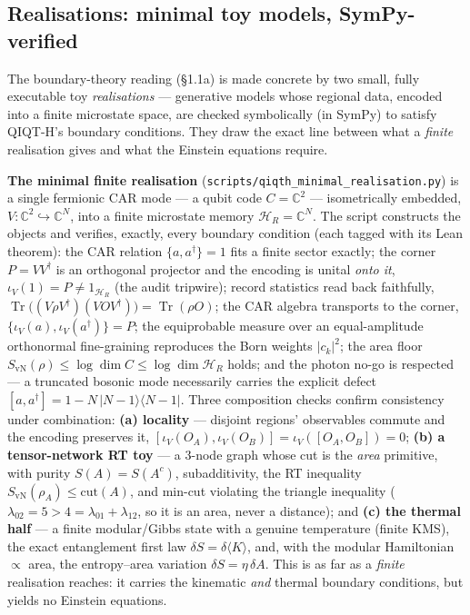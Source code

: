 \documentclass[11pt,a4paper]{article}
\begin{document}
\subsection{Realisations: minimal toy models, SymPy-verified}

The boundary-theory reading (§1.1a) is made concrete by two small, fully executable toy \emph{realisations} — generative models whose regional data, encoded into a finite microstate space, are checked symbolically (in SymPy) to satisfy QIQT-H's boundary conditions. They draw the exact line between what a \emph{finite} realisation gives and what the Einstein equations require.

\textbf{The minimal finite realisation} (\texttt{scripts/qiqth\_minimal\_realisation.py}) is a single fermionic CAR mode — a qubit code $C=\mathbb{C}^2$ — isometrically embedded, $V:\mathbb{C}^2\hookrightarrow\mathbb{C}^N$, into a finite microstate memory $\mathcal{H}_R=\mathbb{C}^N$. The script constructs the objects and verifies, exactly, every boundary condition (each tagged with its Lean theorem): the CAR relation $\{a,a^\dagger\}=1$ fits a finite sector exactly; the corner $P=VV^\dagger$ is an orthogonal projector and the encoding is unital \emph{onto it}, $\iota_V(1)=P\neq 1_{\mathcal{H}_R}$ (the audit tripwire); record statistics read back faithfully, $\operatorname{Tr}\big((V\rho V^\dagger)(VOV^\dagger)\big)=\operatorname{Tr}(\rho O)$; the CAR algebra transports to the corner, $\{\iota_V(a),\iota_V(a^\dagger)\}=P$; the equiprobable measure over an equal-amplitude orthonormal fine-graining reproduces the Born weights $|c_k|^2$; the area floor $S_{\mathrm{vN}}(\rho)\le\log\dim C\le\log\dim\mathcal{H}_R$ holds; and the photon no-go is respected — a truncated bosonic mode necessarily carries the explicit defect $[a,a^\dagger]=1-N\,|N{-}1\rangle\langle N{-}1|$. Three composition checks confirm consistency under combination: \textbf{(a) locality} — disjoint regions' observables commute and the encoding preserves it, $[\iota_V(O_A),\iota_V(O_B)]=\iota_V([O_A,O_B])=0$; \textbf{(b) a tensor-network RT toy} — a $3$-node graph whose cut is the \emph{area} primitive, with purity $S(A)=S(A^c)$, subadditivity, the RT inequality $S_{\mathrm{vN}}(\rho_A)\le\mathrm{cut}(A)$, and min-cut violating the triangle inequality ($\lambda_{02}=5>4=\lambda_{01}+\lambda_{12}$, so it is an area, never a distance); and \textbf{(c) the thermal half} — a finite modular/Gibbs state with a genuine temperature (finite KMS), the exact entanglement first law $\delta S=\delta\langle K\rangle$, and, with the modular Hamiltonian $\propto$ area, the entropy–area variation $\delta S=\eta\,\delta A$. This is as far as a \emph{finite} realisation reaches: it carries the kinematic \emph{and} thermal boundary conditions, but yields no Einstein equations.
\end{document}
